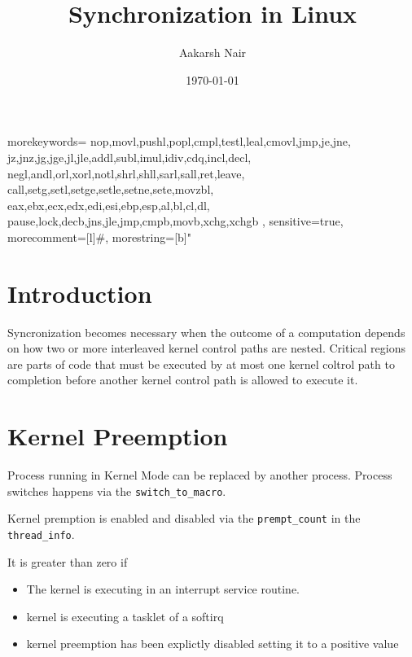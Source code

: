 \documentclass{article}
\title{Synchronization in Linux}
\author{Aakarsh Nair}
\date{\today}
\begin{document}
 {
	morekeywords={
		nop,movl,pushl,popl,cmpl,testl,leal,cmovl,jmp,je,jne,
		jz,jnz,jg,jge,jl,jle,addl,subl,imul,idiv,cdq,incl,decl,
		negl,andl,orl,xorl,notl,shrl,shll,sarl,sall,ret,leave,
		call,setg,setl,setge,setle,setne,sete,movzbl,
		eax,ebx,ecx,edx,edi,esi,ebp,esp,al,bl,cl,dl,
                pause,lock,decb,jns,jle,jmp,cmpb,movb,xchg,xchgb
	},
	sensitive=true,
	morecomment=[l]{\#},
	morestring=[b]"
}

\lstset{language=C}  
\maketitle

\setcounter{tocdepth}{3}
\tableofcontents

\maketitle
\vspace*{1cm}

\section{Introduction}

Syncronization becomes necessary when the outcome of a computation
depends on how two or more interleaved kernel control paths are
nested. Critical regions are parts of code that must be executed by at
most one kernel coltrol path to completion before another kernel
control path is allowed to execute it.

\section{Kernel Preemption}

Process running in Kernel Mode can be replaced by another
process. Process switches happens via the \lstinline{switch_to_macro}.

Kernel premption is enabled and disabled via the
\lstinline{prempt_count} in the \lstinline{thread_info}.

It is greater than zero if 

\begin{itemize}
\item The kernel is executing in an interrupt service routine.
\item kernel is executing a tasklet of a softirq
\item kernel preemption has been explictly disabled setting it to a
  positive value
\end{itemize}
\end{document}
